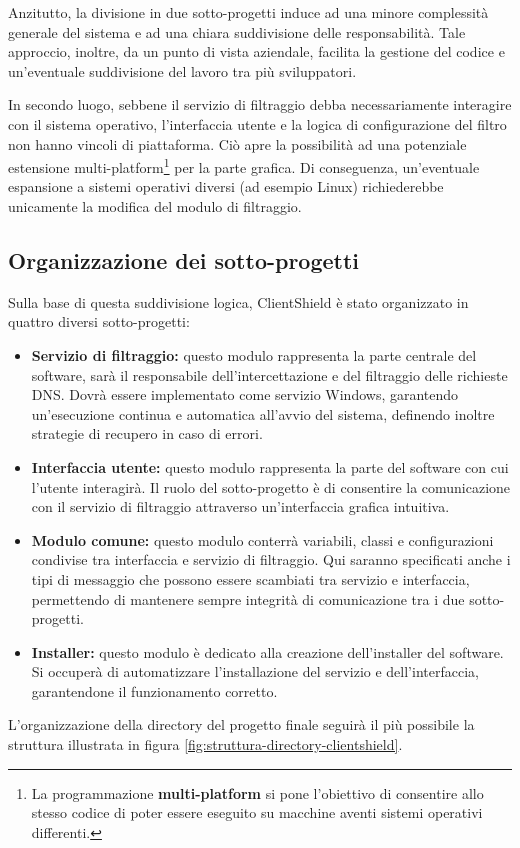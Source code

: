 \documentclass[12pt,a4paper,openright,twoside]{book}
\begin{document}
Anzitutto, la divisione in due sotto-progetti induce ad una minore complessità generale del sistema e ad una chiara suddivisione delle responsabilità.
Tale approccio, inoltre, da un punto di vista aziendale, facilita la gestione del codice e un'eventuale suddivisione del lavoro tra più sviluppatori.

In secondo luogo, sebbene il servizio di filtraggio debba necessariamente interagire con il sistema operativo, l'interfaccia utente e la logica di configurazione del filtro non hanno vincoli di piattaforma.
Ciò apre la possibilità ad una potenziale estensione multi-platform\footnote{La programmazione \textbf{multi-platform} si pone l'obiettivo di consentire allo stesso codice di poter essere eseguito su macchine aventi sistemi operativi differenti.} per la parte grafica.
Di conseguenza, un'eventuale espansione a sistemi operativi diversi (ad esempio Linux) richiederebbe unicamente la modifica del modulo di filtraggio.

\subsection{Organizzazione dei sotto-progetti}
\label{ssec:organizzazione-sotto-progetti}

Sulla base di questa suddivisione logica, ClientShield è stato organizzato in quattro diversi sotto-progetti:

\begin{itemize}
	\item \textbf{Servizio di filtraggio:}
	questo modulo rappresenta la parte centrale del software, sarà il responsabile dell'intercettazione e del filtraggio delle richieste \gls{DNS}.
	Dovrà essere implementato come servizio Windows, garantendo un'esecuzione continua e automatica all'avvio del sistema, definendo inoltre strategie di recupero in caso di errori.
	
	\item \textbf{Interfaccia utente:}
	questo modulo rappresenta la parte del software con cui l'utente interagirà.
	Il ruolo del sotto-progetto è di consentire la comunicazione con il servizio di filtraggio attraverso un'interfaccia grafica intuitiva.
	
	\item \textbf{Modulo comune:}
	questo modulo conterrà variabili, classi e configurazioni condivise tra interfaccia e servizio di filtraggio.
	Qui saranno specificati anche i tipi di messaggio che possono essere scambiati tra servizio e interfaccia, permettendo di mantenere sempre integrità di comunicazione tra i due sotto-progetti.
	
	\item \textbf{Installer:}
	questo modulo è dedicato alla creazione dell'installer del software.
	Si occuperà di automatizzare l'installazione del servizio e dell'interfaccia, garantendone il funzionamento corretto.
\end{itemize}
L'organizzazione della directory del progetto finale seguirà il più possibile la struttura illustrata in figura \ref{fig:struttura-directory-clientshield}.
\end{document}
